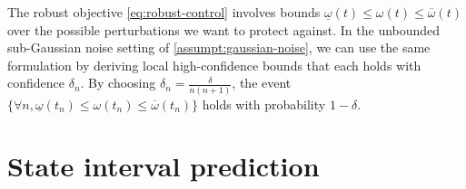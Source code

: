 \begin{remark}
	\begin{leftbar}[remarkbar]
	The robust objective \eqref{eq:robust-control} involves bounds $\underline{\omega}(t)\leq \omega(t) \leq \overline{\omega}(t)$ over the possible perturbations we want to protect against. In the unbounded sub-Gaussian noise setting of \autoref{assumpt:gaussian-noise}, we can use the same formulation by deriving local high-confidence bounds that each holds with confidence $\delta_n$. By choosing $\delta_n = \frac{\delta}{n(n+1)}$, the event $\{\forall n, \underline{\omega}(t_n) \leq \omega(t_n) \leq \overline{\omega}(t_n)\}$ holds with probability $1-\delta$.
	\end{leftbar}
\end{remark}

\section{State interval prediction}


\label{sec:prediction}

